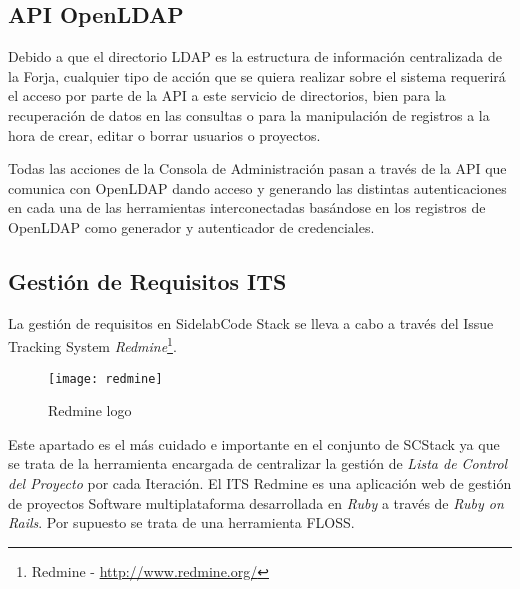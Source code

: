 \subsection{API OpenLDAP}
\label{sub:api-openldap}

\par Debido a que el directorio LDAP es la estructura de información centralizada de la Forja, cualquier tipo de acción que se quiera realizar sobre el sistema requerirá el acceso por parte de la API a este servicio de directorios, bien para la recuperación de datos en las consultas o para la manipulación de registros a la hora de crear, editar o borrar usuarios o proyectos.

\par Todas las acciones de la Consola de Administración pasan a través de la API que comunica con OpenLDAP dando acceso y generando las distintas autenticaciones en cada una de las herramientas interconectadas basándose en los registros de OpenLDAP como generador y autenticador de credenciales.




\subsection{Gestión de Requisitos ITS}
\label{sub:its}

\par La gestión de requisitos en SidelabCode Stack se lleva a cabo a través del Issue Tracking System \emph{Redmine}\footnote{Redmine - \url{http://www.redmine.org/}}.

\begin{figure}[H]
    \centering
    \texttt{[image: redmine]}
    \caption{Redmine logo}
    \label{fig:redmine-logo}
\end{figure}

\par Este apartado es el más cuidado e importante en el conjunto de SCStack ya que se trata de la herramienta encargada de centralizar la gestión de \emph{Lista de Control del Proyecto} por cada Iteración. El ITS Redmine es una aplicación web de gestión de proyectos Software multiplataforma desarrollada en \emph{Ruby} a través de \emph{Ruby on Rails}. Por supuesto se trata de una herramienta FLOSS.

